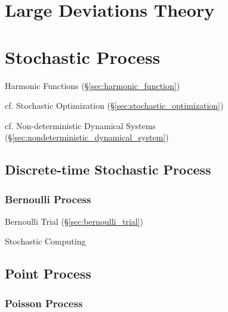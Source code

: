 \section{Large Deviations Theory}\label{sec:large_deviations_theory}

\section{Stochastic Process}\label{sec:stochastic_process}

Harmonic Functions (\S\ref{sec:harmonic_function})

\fist cf. Stochastic Optimization (\S\ref{sec:stochastic_optimization})

\fist cf. Non-deterministic Dynamical Systems
(\S\ref{sec:nondeterministic_dynamical_system})



\subsection{Discrete-time Stochastic Process}
\label{sec:discretetime_stochastic}

\subsubsection{Bernoulli Process}\label{sec:bernoulli_process}

Bernoulli Trial (\S\ref{sec:bernoulli_trial})

Stochastic Computing



\subsection{Point Process}\label{sec:point_process}

\subsubsection{Poisson Process}\label{sec:poisson_process}

